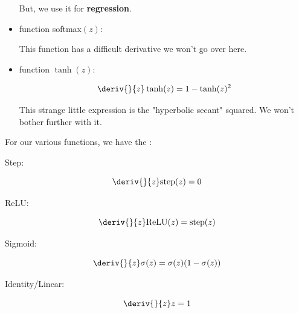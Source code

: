 \begin{itemize}
                But, we use it for \textbf{regression}.
                
            \item {} function softmax$(z)$:
            
                This function has a difficult derivative we won't go over here. 
                
            \item {} function $\tanh(z)$:
            
                \begin{equation}
                    \deriv{}{z}\tanh(z)
                    =
                    1 - \tanh(z)^2
                \end{equation}
                
                This strange little expression is the "hyperbolic secant" squared. We won't bother further with it.\\
        \end{itemize}
        
        
        \begin{notation}
            For our various  functions, we have the :
            
            Step:
            
            \begin{equation*}
                \deriv{}{z} \text{step}(z) = 0
            \end{equation*}
            
            ReLU:
            
            \begin{equation*}
                \deriv{}{z} \text{ReLU}(z) = \text{step}(z)
            \end{equation*}
            
            Sigmoid:
            
            \begin{equation*}
                \deriv{}{z}\sigma(z) 
                =
                \sigma(z)(1-\sigma(z))
            \end{equation*}
            
            Identity/Linear:
            
            \begin{equation*}
                \deriv{}{z} z 
                =
                1
            \end{equation*}
        \end{notation}
        
